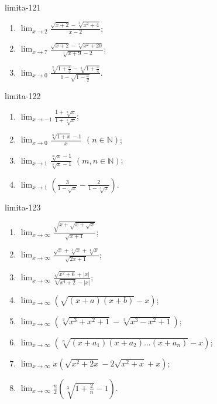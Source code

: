 \begin{defproblem}{limita-121}
\begin{enumerate}
\item $\lim_{x \rightarrow 2} \frac{\sqrt{x+2}-\sqrt[3]{x^2+4}}{x-2}$;
\item  $\lim_{x \rightarrow 7} \frac{\sqrt{x+2}-\sqrt[3]{x^2+20}}{\sqrt[4]{x+9}-2}$;
\item  $\lim_{x \rightarrow 0} \frac{\sqrt[3]{1+\frac{x}{3}}-\sqrt[4]{1+\frac{x}{4}}}{1-\sqrt{1-\frac{x}{2}}}$.
\end{enumerate}
\end{defproblem}

\begin{defproblem}{limita-122}
\begin{enumerate}
\item $\lim_{x \rightarrow -1} \frac{1+\sqrt[3]{x}}{1+\sqrt[5]{x}}$;
\item $\lim_{x \rightarrow 0} \frac{\sqrt[n]{1+x}-1}{x}$  $(n \in \mathbb{N})$;
\item $\lim_{x \rightarrow 1} \frac{\sqrt[m]{x}-1}{\sqrt[n]{x}-1}$  $(m,n \in \mathbb{N})$;
\item $\lim_{x \rightarrow 1} (\frac{3}{1-\sqrt{x}}-\frac{2}{1-\sqrt[3]{x}})$.
\end{enumerate}
\end{defproblem}

\begin{defproblem}{limita-123}
\begin{multicols}{2}
\begin{enumerate}
    \item $\lim_{{x \rightarrow \infty}} \frac{\sqrt{x+\sqrt{x+\sqrt{x}}}}{\sqrt{x+1}}$;
    \item $\lim_{{x \rightarrow \infty}} \frac{\sqrt{x}+\sqrt[3]{x}+\sqrt[4]{x}}{\sqrt{2x+1}}$;
    \item $\lim_{{x \rightarrow \infty}} \frac{\sqrt{x^2+6}+|x|}{\sqrt[6]{x^4+2}-|x|}$;
    \item $\lim_{{x \rightarrow \infty}} (\sqrt{(x+a)(x+b)}-x)$;
    \item $\lim_{{x \rightarrow \infty}} (\sqrt[3]{x^3+x^2+1}-\sqrt[3]{x^3-x^2+1})$;
    \item $\lim_{{x \rightarrow \infty}} (\sqrt[n]{(x+a_1)(x+a_2)...(x+a_n)}-x)$;
    \item $\lim_{{x \rightarrow \infty}} x(\sqrt{x^2+2x}-2\sqrt{x^2+x}+x)$;
    \item $\lim_{{x \rightarrow \infty}} \frac{n}{2}(\sqrt[3]{1+\frac{2}{n}}-1)$.
\end{enumerate}
\end{multicols}
\end{defproblem}

